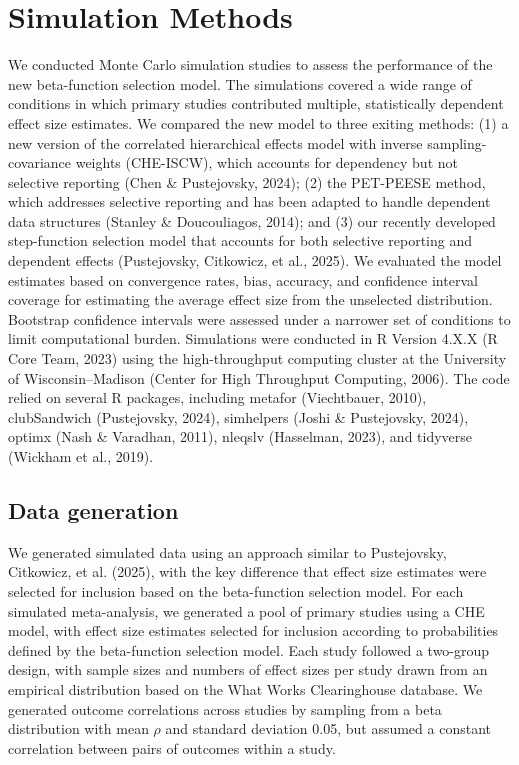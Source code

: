 \documentclass[
  american,
  man, donotrepeattitle,floatsintext]{apa7}
\begin{document}
\section{Simulation Methods}\label{simulation-methods}

We conducted Monte Carlo simulation studies to assess the performance of the new beta-function selection model. The simulations covered a wide range of conditions in which primary studies contributed multiple, statistically dependent effect size estimates. We compared the new model to three exiting methods: (1) a new version of the correlated hierarchical effects model with inverse sampling-covariance weights (CHE-ISCW), which accounts for dependency but not selective reporting (Chen \& Pustejovsky, 2024); (2) the PET-PEESE method, which addresses selective reporting and has been adapted to handle dependent data structures (Stanley \& Doucouliagos, 2014); and (3) our recently developed step-function selection model that accounts for both selective reporting and dependent effects (Pustejovsky, Citkowicz, et al., 2025). We evaluated the model estimates based on convergence rates, bias, accuracy, and confidence interval coverage for estimating the average effect size from the unselected distribution. Bootstrap confidence intervals were assessed under a narrower set of conditions to limit computational burden. Simulations were conducted in R Version 4.X.X (R Core Team, 2023) using the high-throughput computing cluster at the University of Wisconsin--Madison (Center for High Throughput Computing, 2006). The code relied on several R packages, including metafor (Viechtbauer, 2010), clubSandwich (Pustejovsky, 2024), simhelpers (Joshi \& Pustejovsky, 2024), optimx (Nash \& Varadhan, 2011), nleqslv (Hasselman, 2023), and tidyverse (Wickham et al., 2019).

\subsection{Data generation}\label{data-generation}

We generated simulated data using an approach similar to Pustejovsky, Citkowicz, et al. (2025), with the key difference that effect size estimates were selected for inclusion based on the beta-function selection model. For each simulated meta-analysis, we generated a pool of primary studies using a CHE model, with effect size estimates selected for inclusion according to probabilities defined by the beta-function selection model. Each study followed a two-group design, with sample sizes and numbers of effect sizes per study drawn from an empirical distribution based on the What Works Clearinghouse database. We generated outcome correlations across studies by sampling from a beta distribution with mean \(\rho\) and standard deviation 0.05, but assumed a constant correlation between pairs of outcomes within a study.
\end{document}
